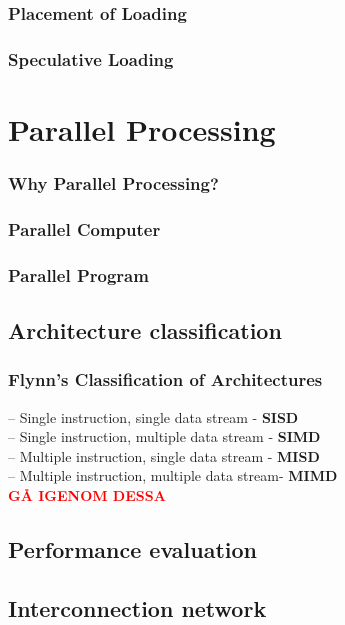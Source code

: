 \documentclass[titlepage, a4paper]{article}
\newcommand{\todo}[1] {\textbf{\textcolor{red}{#1}}}
\begin{document}
\subsubsection{Placement of Loading}
\subsubsection{Speculative Loading}

\section{Parallel Processing}
\subsubsection{Why Parallel Processing?}
\subsubsection{Parallel Computer}
\subsubsection{Parallel Program}

\subsection{Architecture classification}
\subsubsection{Flynn’s Classification of Architectures}
-- Single instruction, single data stream - \textbf{SISD} \\
-- Single instruction, multiple data stream - \textbf{SIMD} \\
-- Multiple instruction, single data stream - \textbf{MISD} \\
-- Multiple instruction, multiple data stream- \textbf{MIMD} \\

\todo{GÅ IGENOM DESSA}\\

\subsection{Performance evaluation}

\subsection{Interconnection network}
\end{document}
